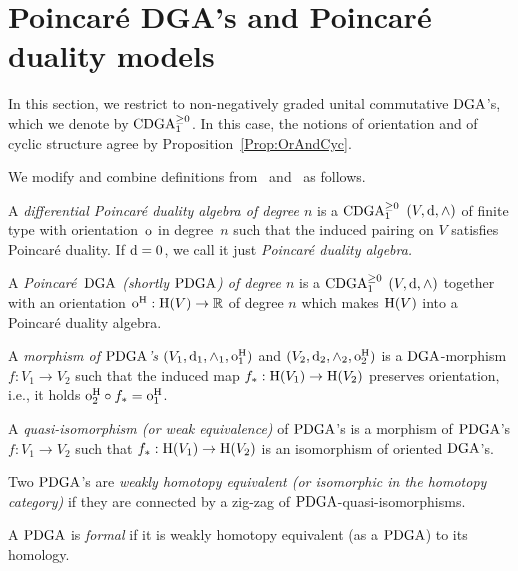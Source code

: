 \documentclass[\MainFolder/Text.tex]{subfiles}
\begin{document}
\section{Poincar\'e DGA's and Poincar\'e duality models}\label{SubSec:PoincModel}
\allowdisplaybreaks
{}


In this section, we restrict to non-negatively graded unital commutative $\mathrm{DGA}$'s, which we denote by $\mathrm{CDGA}_{1}^{\ge 0}$. In this case, the notions of orientation and of cyclic structure agree by Proposition~\ref{Prop:OrAndCyc}.

We modify and combine definitions from~\cite{Van2019} and~\cite{Lambrechts2007} as follows.

\begin{Definition}\label{Def:PDGA}
A \emph{differential Poincar\'e duality algebra of degree $n$} is a $\mathrm{CDGA}_{1}^{\ge 0}$ $(V,\mathrm{d},\wedge)$ of finite type with orientation~$\mathrm{o}$ in degree~$n$ such that the induced pairing on $V$ satisfies Poincar\'e duality. If $\mathrm{d} = 0$, we call it just \emph{Poincar\'e duality algebra.}

A \emph{Poincar\'e~$\mathrm{DGA}$ (shortly $\mathrm{PDGA}$) of degree $n$} is a $\mathrm{CDGA}_{1}^{\ge 0}$ $(V,\mathrm{d},\wedge)$ together with an orientation $\mathrm{o}^{\mathrm{H}}: \mathrm{H}(V) \rightarrow \mathbb{R}$  of degree $n$ which makes $\mathrm{H}(V)$ into a Poincar\'e duality algebra.

A \emph{morphism of $\mathrm{PDGA}$'s} $(V_1,\mathrm{d}_1,\wedge_1,\mathrm{o}^{\mathrm{H}}_1)$ and $(V_2,\mathrm{d}_2,\wedge_2,\mathrm{o}^{\mathrm{H}}_2)$ is a $\mathrm{DGA}$-morphism $f: V_1 \rightarrow V_2$ such that the induced map $f_*: \mathrm{H}(V_1) \rightarrow \mathrm{H}(V_2)$ preserves orientation, i.e., it holds $\mathrm{o}_2^{\mathrm{H}} \circ f_* = \mathrm{o}_1^{\mathrm{H}}$.

A \emph{quasi-isomorphism (or weak equivalence)} of $\mathrm{PDGA}$'s is a morphism of $\mathrm{PDGA}$'s $f: V_1 \rightarrow V_2$ such that $f_*: \mathrm{H}(V_1) \rightarrow \mathrm{H}(V_2)$ is an isomorphism of oriented $\mathrm{DGA}$'s.

Two $\mathrm{PDGA}$'s are \emph{weakly homotopy equivalent (or isomorphic in the homotopy category)} if they are connected by a zig-zag of $\mathrm{PDGA}$-quasi-isomorphisms.

A $\mathrm{PDGA}$ is \emph{formal} if it is weakly homotopy equivalent (as a $\mathrm{PDGA}$) to its homology.
\end{Definition}
\end{document}
